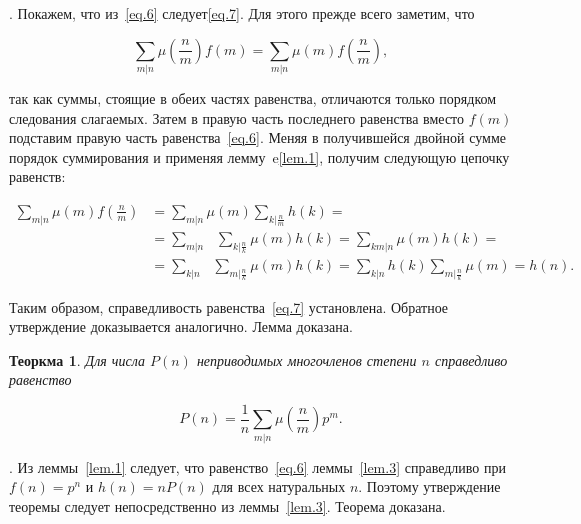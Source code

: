 \documentclass{article}
\numberwithin{equation}{section}
\begin{document}
    {}.
    Покажем, что из~\eqref{eq.6} следует\eqref{eq.7}. 
    Для этого прежде всего заметим, что
    
    \[
       \sum_{m|n} \mu (\frac nm) f(m) = \sum_{m|n} \mu(m) f(\frac nm),
    \]
    
    \noindent так как суммы, стоящие в обеих частях равенства, отличаются только порядком следования слагаемых.
    Затем в правую часть последнего равенства вместо $f(m)$ подставим правую часть равенства~\eqref{eq.6}.
    Меняя в получившейся двойной сумме порядок суммирования и применяя лемму~e\eqref{lem.1}, получим следующую цепочку равенств:
    
    \[
        \begin{split}
            \sum_{m|n} \mu(m) f(\frac nm) &= \sum_{m|n} \mu(m) \sum_{k|\frac nm} h(k) =\\
                                          &= \sum_{m|n} \,\,\,\, \sum_{k|\frac nk} \mu(m) h(k) = \sum_{km|n} \mu(m) h(k) =\\
                                          &= \sum_{k|n} \,\,\,\, \sum_{m|\frac nk} \mu(m) h(k) = \sum_{k|n} h(k) \sum_{m|\frac nk} \mu(m) = h(n).
        \end{split}
    \]
    
    Таким образом, справедливость равенства~\eqref{eq.7} установлена.
    Обратное утверждение доказывается аналогично.
    Лемма доказана.
    
    \newtheorem{Th}{Теоркма}
       \begin{Th}
           Для числа $P(n)$ неприводимых многочленов степени $n$ справедливо равенство
           
               \[
                   P(n) = \frac 1n \sum_{m|n} \mu(\frac nm) p^m.
               \]
           
       \label{th.1}
    \end{Th}
    
    {}.
    Из леммы~\eqref{lem.1} следует, что равенство~\eqref{eq.6} леммы~\eqref{lem.3} справедливо при $f(n) = p^n$ и  $h(n) = nP(n)$ для всех натуральных $n$.
    Поэтому утверждение теоремы следует непосредственно из леммы~\eqref{lem.3}.
    Теорема доказана.
\end{document}
